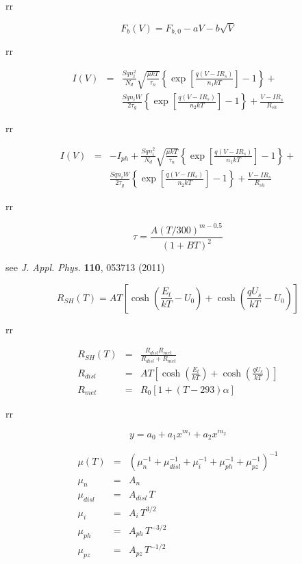 \documentclass[14pt]{article}
\numberwithin{equation}{part}
\begin{document}
rr

\begin{equation*}
   F_b(V)=F_{b,0}-a V-b\sqrt{V}
\end{equation*}

rr

\begin{eqnarray*}
  I(V)&=&\frac{Sqn_i^2}{N_d}\sqrt{\frac{\mu k T}{\tau_n}}\left\{\exp \left[\frac{q(V-IR_s)}{n_1kT}\right]-1\right\}+\\
  &&\frac{Sqn_iW}{2\tau_g}\left\{\exp \left[\frac{q(V-IR_s)}{n_2kT}\right]-1\right\}+ \frac{V-IR_s}{R_{sh}}
\end{eqnarray*}


rr

\begin{eqnarray*}
  I(V)&=&-I_{ph}+\frac{Sqn_i^2}{N_d}\sqrt{\frac{\mu k T}{\tau_n}}\left\{\exp \left[\frac{q(V-IR_s)}{n_1kT}\right]-1\right\}+\\
  &&\frac{Sqn_iW}{2\tau_g}\left\{\exp \left[\frac{q(V-IR_s)}{n_2kT}\right]-1\right\}+ \frac{V-IR_s}{R_{sh}}
\end{eqnarray*}


rr

\begin{equation*}
  \tau=\frac{A(T/300)^{m-0.5}}{(1+BT)^2}
\end{equation*}

see \emph{J. Appl. Phys.} \textbf{110}, 053713 (2011)



\begin{equation*}
  R_{SH}(T)=AT\left[\cosh\left(\frac{E_t}{kT}-U_0\right)+\cosh\left(\frac{qU_s}{kT}-U_0\right)\right]
\end{equation*}

rr

\begin{eqnarray*}
    R_{SH}(T)&=&\frac{R_{disl}R_{met}}{R_{disl}+R_{met}}\\
    R_{disl}&=&AT\left[\cosh\left(\frac{E_t}{kT}\right)+\cosh\left(\frac{qU_s}{kT}\right)\right]\\
    R_{met}&=&R_0\left[1+(T-293)\alpha\right]
\end{eqnarray*}

rr

\begin{equation*}
  y=a_0+a_1x^{m_1}+a_2x^{m_2}
\end{equation*}

\begin{eqnarray*}
    \mu(T)&=&(\mu_n^{-1}+\mu_{disl}^{-1}+\mu_i^{-1}+\mu_{ph}^{-1}+\mu_{pz}^{-1})^{-1}\\
    \mu_n&=&A_n\\
    \mu_{disl}&=&A_{disl}\,T\\
    \mu_{i}&=&A_{i}\,T^{3/2}\\
    \mu_{ph}&=&A_{ph}\,T^{-3/2}\\
    \mu_{pz}&=&A_{pz}\,T^{-1/2}
\end{eqnarray*}
\end{document}
